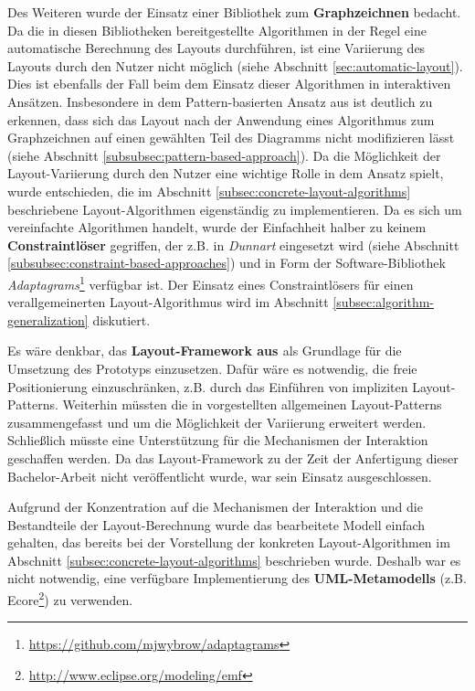 Des Weiteren wurde der Einsatz einer Bibliothek zum \textbf{Graphzeichnen} bedacht. Da die in diesen Bibliotheken bereitgestellte Algorithmen in der Regel eine automatische Berechnung des Layouts durchführen, ist eine Variierung des Layouts durch den Nutzer nicht möglich (siehe Abschnitt \ref{sec:automatic-layout}). Dies ist ebenfalls der Fall beim dem Einsatz dieser Algorithmen in interaktiven Ansätzen. Insbesondere in dem Pattern-basierten Ansatz aus \cite{Maier12A-Pattern-based} ist deutlich zu erkennen, dass sich das Layout nach der Anwendung eines Algorithmus zum Graphzeichnen auf einen gewählten Teil des Diagramms nicht modifizieren lässt (siehe Abschnitt \ref{subsubsec:pattern-based-approach}). Da die Möglichkeit der Layout-Variierung durch den Nutzer eine wichtige Rolle in dem Ansatz spielt, wurde entschieden, die im Abschnitt \ref{subsec:concrete-layout-algorithms} beschriebene Layout-Algorithmen eigenständig zu implementieren. Da es sich um vereinfachte Algorithmen handelt, wurde der Einfachheit halber zu keinem \textbf{Constraintlöser} gegriffen, der z.B. in \textit{Dunnart} eingesetzt wird (siehe Abschnitt \ref{subsubsec:constraint-based-approaches}) und in Form der Software-Bibliothek \textit{Adaptagrams}\footnote{\url{https://github.com/mjwybrow/adaptagrams}} verfügbar ist. Der Einsatz eines Constraintlösers für einen verallgemeinerten Layout-Algorithmus wird im Abschnitt \ref{subsec:algorithm-generalization} diskutiert.

Es wäre denkbar, das \textbf{Layout-Framework aus \cite{Maier12A-Pattern-based}} als Grundlage für die Umsetzung des Prototyps einzusetzen. Dafür wäre es notwendig, die freie Positionierung einzuschränken, z.B. durch das Einführen von impliziten Layout-Patterns. Weiterhin müssten die in \cite{Maier12A-Pattern-based} vorgestellten allgemeinen Layout-Patterns zusammengefasst und um die Möglichkeit der Variierung erweitert werden. Schließlich müsste eine Unterstützung für die Mechanismen der Interaktion geschaffen werden. Da das Layout-Framework zu der Zeit der Anfertigung dieser Bachelor-Arbeit nicht veröffentlicht wurde, war sein Einsatz ausgeschlossen.

Aufgrund der Konzentration auf die Mechanismen der Interaktion und die Bestandteile der Layout-Berechnung wurde das bearbeitete Modell einfach gehalten, das bereits bei der Vorstellung der konkreten Layout-Algorithmen im Abschnitt \ref{subsec:concrete-layout-algorithms} beschrieben wurde. Deshalb war es nicht notwendig, eine verfügbare Implementierung des \textbf{UML-Metamodells} (z.B. Ecore\footnote{\url{http://www.eclipse.org/modeling/emf}}) zu verwenden.

